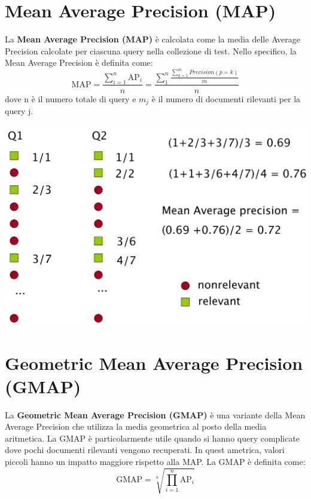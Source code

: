 \documentclass{report}
\begin{document}
	\section{Mean Average Precision (MAP)}
	La \textbf{Mean Average Precision (MAP)} è calcolata come la media delle Average Precision calcolate per ciascuna query nella collezione di test. Nello specifico, la Mean Average Precision è definita come:
	\[
		\text{MAP} = \frac{\sum_{i=1}^{n} \text{AP}_i}{n} = \frac{\sum_{1}^{n} \frac{\sum_{k=1}^{m} Precision(p=k)}{m}}{n}
	\]
	dove n è il numero totale di query e $m_j$ è il numero di documenti rilevanti per la query j.
	\begin{center}
		\includegraphics[scale=0.3]{assets/mean-average-precision.png}
	\end{center}

	\section{Geometric Mean Average Precision (GMAP)}
	La \textbf{Geometric Mean Average Precision (GMAP)} è una variante della Mean Average Precision che utilizza la media geometrica al posto della media aritmetica. La GMAP è particolarmente utile quando si hanno query complicate dove pochi documenti rilevanti vengono recuperati. In quest ametrica, valori piccoli hanno un impatto maggiore rispetto alla MAP. La GMAP è definita come:
	\[
		\text{GMAP} = \sqrt[n]{\prod_{i=1}^{n} \text{AP}_i}
	\]
\end{document}
